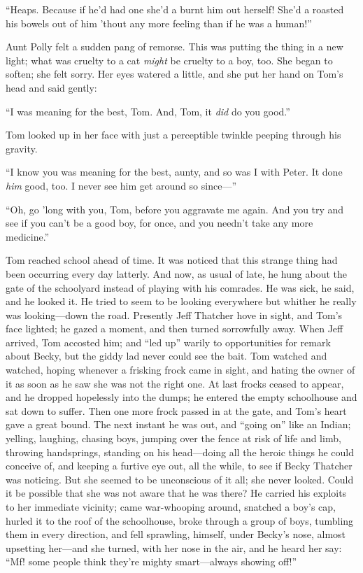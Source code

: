 \documentclass{book}
\begin{document}
“Heaps. Because if he’d had one she’d a burnt him out herself! She’d a roasted his bowels out of him ’thout any more feeling than if he was a human!”

Aunt Polly felt a sudden pang of remorse. This was putting the thing in a new light; what was cruelty to a cat \emph{might} be cruelty to a boy, too. She began to soften; she felt sorry. Her eyes watered a little, and she put her hand on Tom’s head and said gently:

“I was meaning for the best, Tom. And, Tom, it \emph{did} do you good.”

Tom looked up in her face with just a perceptible twinkle peeping through his gravity.

“I know you was meaning for the best, aunty, and so was I with Peter. It done \emph{him} good, too. I never see him get around so since—”

“Oh, go ’long with you, Tom, before you aggravate me again. And you try and see if you can’t be a good boy, for once, and you needn’t take any more medicine.”

Tom reached school ahead of time. It was noticed that this strange thing had been occurring every day latterly. And now, as usual of late, he hung about the gate of the schoolyard instead of playing with his comrades. He was sick, he said, and he looked it. He tried to seem to be looking everywhere but whither he really was looking—down the road. Presently Jeff Thatcher hove in sight, and Tom’s face lighted; he gazed a moment, and then turned sorrowfully away. When Jeff arrived, Tom accosted him; and “led up” warily to opportunities for remark about Becky, but the giddy lad never could see the bait. Tom watched and watched, hoping whenever a frisking frock came in sight, and hating the owner of it as soon as he saw she was not the right one. At last frocks ceased to appear, and he dropped hopelessly into the dumps; he entered the empty schoolhouse and sat down to suffer. Then one more frock passed in at the gate, and Tom’s heart gave a great bound. The next instant he was out, and “going on” like an Indian; yelling, laughing, chasing boys, jumping over the fence at risk of life and limb, throwing handsprings, standing on his head—doing all the heroic things he could conceive of, and keeping a furtive eye out, all the while, to see if Becky Thatcher was noticing. But she seemed to be unconscious of it all; she never looked. Could it be possible that she was not aware that he was there? He carried his exploits to her immediate vicinity; came war-whooping around, snatched a boy’s cap, hurled it to the roof of the schoolhouse, broke through a group of boys, tumbling them in every direction, and fell sprawling, himself, under Becky’s nose, almost upsetting her—and she turned, with her nose in the air, and he heard her say: “Mf! some people think they’re mighty smart—always showing off!”
\end{document}
